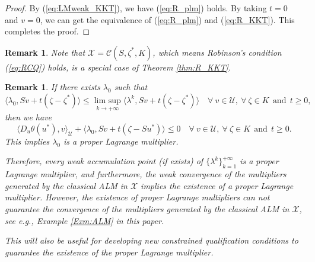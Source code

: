 \documentclass[leqno]{amsart}
\DeclareMathOperator*\uplim{lim\ sup}
\newtheorem{Remark}[Theorem]{Remark}
\theoremstyle{definition}
\begin{document}
\begin{proof}
By (\ref{eq:LMweak_KKT}), we have (\ref{eq:R_plm}) holds. By taking $t = 0$ and $v = 0$, we can get the equivalence of (\ref{eq:R_plm}) and (\ref{eq:R_KKT}). This completes the proof.
\end{proof}


\begin{Remark}
Note that $\mathcal{X} = \mathcal{C}(S, \zeta^*, K)$, which means Robinson’s condition (\ref{eq:RCQ}) holds, is a special case of Theorem \ref{thm:R_KKT}.
\end{Remark}

\begin{Remark}
If there exists $\lambda_0$ such that 
$$\langle \lambda_0, Sv + t(\zeta - \zeta^*)\rangle \leq \uplim\limits_{k\rightarrow +\infty}\langle \lambda^{k}, Sv + t(\zeta - \zeta^*)\rangle  \quad \forall\ v\in \mathcal{U},\ \forall\ \zeta\in K\ \ \mbox{and}\ \ t\geq 0,$$
then we have
$$\langle D_u\theta(u^*), v\rangle_\mathcal{U}  + \langle \lambda_0, Sv + t(\zeta - Su^*)\rangle \leq 0\quad \forall\ v\in \mathcal{U},\ \forall\ \zeta\in K\ \ \mbox{and}\ \ t\geq 0. $$
This implies $\lambda_0$ is a proper Lagrange multiplier. 

Therefore, every weak accumulation point (if exists) of $\{\lambda^k\}_{k=1}^{+\infty}$ is a proper Lagrange multiplier, and furthermore, the weak convergence of the multipliers generated by the classical ALM in $\mathcal{X}$ implies the existence of a proper Lagrange multiplier. However, the existence of proper Lagrange multipliers can not guarantee the convergence of the multipliers generated by the classical ALM in $\mathcal{X}$, see e.g., Example \ref{Exm:ALM} in this paper. 

This will also be useful for developing new constrained qualification conditions to guarantee the existence of the proper Lagrange multiplier.
\end{Remark}
\end{document}
